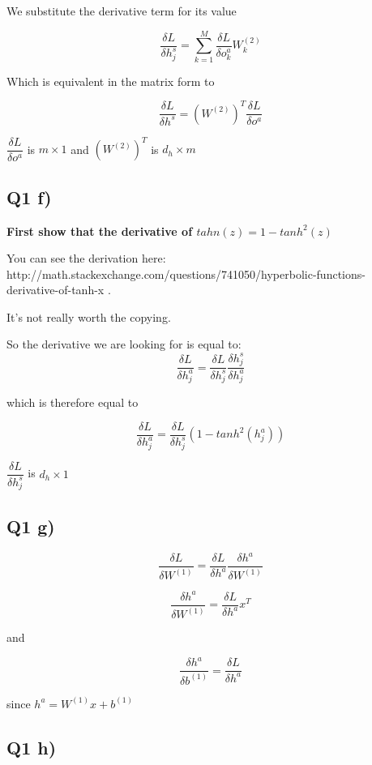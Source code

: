 \documentclass{article}
\begin{document}
We substitute the derivative term for its value

\[ \dfrac {\delta L} {\delta h^s_j} = \sum \limits_{k=1}^M \dfrac {\delta L} {\delta o^a_k}  W^{(2)}_k\]

Which is equivalent in the matrix form to

\[\dfrac {\delta L} {\delta h^s} = (W^{(2)})^T \dfrac {\delta L} {\delta o^a}\]

$\dfrac {\delta L} {\delta o^a}$ is $m \times 1$ and $(W^{(2)})^T$ is
$d_h \times m$

    \subsection{Q1 f)}\label{q1-f}

    \textbf{First show that the derivative of $tahn(z) = 1 - tanh^2(z)$}

You can see the derivation here:
http://math.stackexchange.com/questions/741050/hyperbolic-functions-derivative-of-tanh-x
.

It's not really worth the copying.

    So the derivative we are looking for is equal to:
\[\dfrac {\delta L} {\delta h^a_j} = \dfrac {\delta L} {\delta h^s_j} \dfrac {\delta h^s_j} {\delta h^a_j}\]

which is therefore equal to

\[\dfrac {\delta L} {\delta h^a_j} = \dfrac {\delta L} {\delta h^s_j} (1 - tanh^2(h^a_j))\]

$\dfrac {\delta L} {\delta h^s_j}$ is $d_h \times 1$

    \subsection{Q1 g)}\label{q1-g}

    \[\dfrac {\delta L} {\delta W^{(1)}} = \dfrac {\delta L} {\delta h^a} \dfrac {\delta h^a} {\delta W^{(1)}}\]

\[\dfrac {\delta h^a} {\delta W^{(1)}} = \dfrac {\delta L} {\delta h^a}  x^T\]

and

\[\dfrac {\delta h^a} {\delta b^{(1)}} = \dfrac {\delta L} {\delta h^a}\]

since $h^a = W^{(1)}x + b^{(1)}$

    \subsection{Q1 h)}\label{q1-h}
\end{document}
